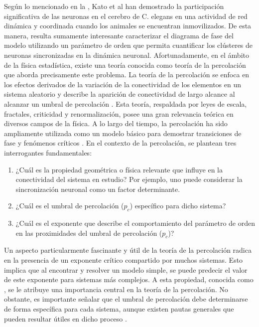Según lo  mencionado en la , Kato et al \cite{kato_global_2015}  han demostrado la  participación significativa de las neuronas en el cerebro de C. elegans en una actividad de red dinámica y coordinada cuando los animales se encuentran inmovilizados. De esta manera, resulta sumamente interesante caracterizar el diagrama de fase del modelo utilizando un parámetro de orden que permita cuantificar los clústeres de neuronas sincronizadas en la dinámica neuronal. Afortunadamente, en el ámbito de la física estadística, existe una teoría  conocida como teoría de la percolación que aborda precisamente este problema. La teoría de la percolación se enfoca en los efectos derivados de la variación de la conectividad de los elementos en un sistema aleatorio y describe la aparición de conectividad de largo alcance al alcanzar un umbral de percolación \cite{torquato_percolation_2002}. Esta teoría, respaldada por leyes de escala, fractales, criticidad y renormalización, posee una gran relevancia teórica en diversos campos de la física. A lo largo del tiempo, la percolación ha sido ampliamente utilizada como un modelo básico para demostrar transiciones de fase y fenómenos críticos \cite{li_percolation_2021}. En el contexto de la percolación, se plantean tres interrogantes fundamentales:

\begin{enumerate}[label={(\alph*)}]
\item  ¿Cuál es la propiedad geométrica o física relevante que influye en la conectividad del sistema en estudio? Por ejemplo, uno puede considerar la sincronización neuronal como un factor determinante.
\item ¿Cuál es el umbral de percolación ($p_c$) específico para dicho sistema?
\item  ¿Cuál es el exponente que describe el comportamiento del parámetro de orden en las proximidades del umbral de percolación ($p_c$)?
\end{enumerate}

Un aspecto particularmente fascinante y útil de la teoría de la percolación radica en la presencia de un exponente crítico compartido por muchos sistemas. Esto implica que al encontrar y resolver un modelo simple, se puede predecir el valor de este exponente para sistemas más complejos. A esta propiedad, conocida como , se le atribuye una importancia central en la teoría de la percolación. No obstante, es importante señalar que el umbral de percolación debe determinarse de forma específica para cada sistema, aunque existen pautas generales que pueden resultar útiles en dicho proceso \cite{berkowitz_percolation_1998}.

